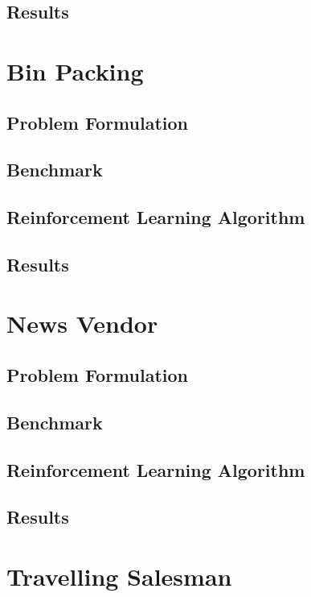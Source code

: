 \documentclass[12pt]{article}
\begin{document}
\subsection{Results}

\section{Bin Packing}

\subsection{Problem Formulation}

\subsection{Benchmark}

\subsection{Reinforcement Learning Algorithm}

\subsection{Results}

\section{News Vendor}

\subsection{Problem Formulation}

\subsection{Benchmark}

\subsection{Reinforcement Learning Algorithm}

\subsection{Results}

\section{Travelling Salesman}
\end{document}
